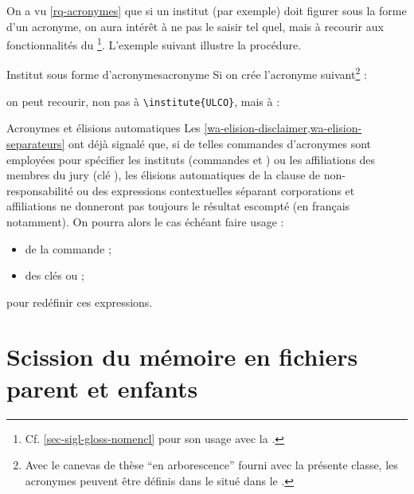 On a vu \vref{rq-acronymes} que si un institut (par exemple) doit figurer
sous la forme d'un acronyme, on aura intérêt à ne pas le saisir tel
quel, mais à recourir aux fonctionnalités du
\footnote{Cf. \vref{sec-sigl-gloss-nomencl} pour
  son usage avec la \yatCl{}.}. L'exemple suivant illustre la
procédure.
%
\begin{dbexample}{Institut sous forme d'acronymes}{acronyme}
  Si on crée l'acronyme suivant\footnote{Avec le canevas de thèse \enquote{en
      arborescence} fourni avec la présente classe, les acronymes peuvent être
    définis dans le \File{\acronymsfile} situé dans le
    \Folder{\auxiliarydirectory}.} :
\begin{preamblecode}[listing options={moretexcs={newacronym}}]
\end{preamblecode}
on peut recourir, non pas à \lstinline[deletekeywords={[5]institute}]|\institute{ULCO}|, mais à :
\begin{preamblecode}[listing options={deletekeywords={[5]institute}}]
\end{preamblecode}
\end{dbexample}

\begin{dbremark}{Acronymes et élisions automatiques}{}
  Les \vref{wa-elision-disclaimer,wa-elision-separateurs} ont déjà
  signalé que, si de telles commandes d'acronymes sont employées pour spécifier
  les instituts (commandes  et ) ou les
  affiliations des membres du jury (clé ), les élisions
  automatiques de la clause de non-responsabilité ou des expressions
  contextuelles séparant corporations et affiliations ne donneront pas toujours le
  résultat escompté (en français notamment). On pourra alors le cas échéant
  faire usage :
  \begin{itemize}
  \item de la commande  ;
  \item des clés  ou  ;
  \end{itemize}
  pour redéfinir ces expressions.
\end{dbremark}

\section{Scission du mémoire en fichiers parent et enfants}
\label{sec-repart-du-memo}


